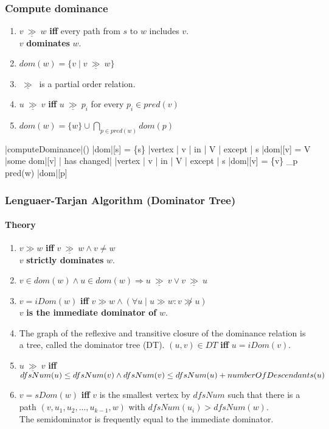 \documentclass[a4paper,12pt, notitlepage]{article}
\newcommand{\gge}{\ \underline{\gg}\ }
\newcommand{\patodo}[3]{(\forall #1 \mid #2 : #3)}
\renewcommand{\iff}{\textbf{ iff }}
\newcommand{\negv}{\vspace{-0.7cm}}
\begin{document}
\subsubsection*{Compute dominance}
\begin{enumerate}
\item $v \gge w $ \iff every path from $s$ to $w$ includes $v$. 
\\ $v$ \textbf{dominates} $w$.
\item $dom(w) = \{v \mid v \gge w\}$
\item $\gge$ is a partial order relation. 
\item $u \gge v$ \iff $u \gge p_i$ for every $p_i \in pred(v)$
\item $dom(w) = \{w\} \cup \displaystyle \bigcap_{p \in pred(w)} dom(p)$
\end{enumerate}
\negv
\begin{program}
\PROC |computeDominance|() \BODY
    |dom|[s] = \{s\}
    \FOREACH |vertex | v | in | V | except | s \DO
        |dom|[v] = V \OD
    \WHILE |some dom|[v] | has changed| \DO
        \FOREACH |vertex | v | in | V | except | s \DO
            |dom|[v] = \{v\} \cup \displaystyle \bigcap_{p \in pred(w)} |dom|[p]
            \OD
    \OD
\end{program}
\subsubsection*{Lenguaer-Tarjan Algorithm (Dominator Tree)}
\paragraph*{Theory}
\begin{enumerate}
\item $v \gg w $ \iff $v \gge w \land v \not= w$
\\ $v$ \textbf{strictly dominates} $w$.
\item $v \in dom(w) \land u \in dom(w) \Rightarrow u \gge v \lor v \gge u$
\item $v = iDom(w)$ \iff $v \gg w \land \patodo{u}{u \gg w}{v \not\gg u}$
\\ $v$ \textbf{is the immediate dominator of} $w$.
\item The graph of the reflexive and transitive closure of the dominance
relation is a  tree, called the dominator tree (DT). $(u,v) \in DT$ 
\iff $u = iDom(v)$.
\item $u \gge v$ \iff $dfsNum(u) \leq dfsNum(v) \land \\ 
dfsNum(v) \leq dfsNum(u) + numberOfDescendants(u)$
\item $v = sDom(w)$ \iff $v$ is the smallest vertex by $dfsNum$ such that there
is a path $(v, u_1, u_2, ..., u_{k-1}, w)$ with $dfsNum(u_i) > dfsNum(w)$.
\\ The semidominator is frequently equal to the immediate dominator.
\end{enumerate}
\end{document}
